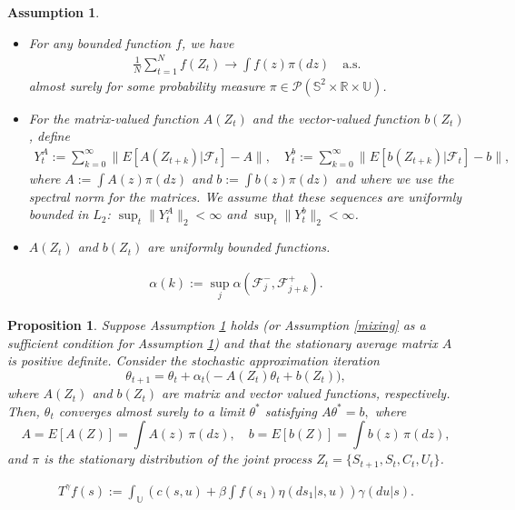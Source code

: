 \documentclass[10pt,a4paper]{amsart}
\newtheorem{assumption}{Assumption}
\newtheorem{prop}{Proposition}
\def\P{{\mathcal P}}
\begin{document}
\begin{assumption}\label{poisson}
\begin{itemize}
\item[i.] For any bounded function $f$, we have
\begin{align*}
\frac{1}{N} \sum_{t=1}^N f(Z_t) \to \int f(z) \pi(dz) \quad \text{a.s.}
\end{align*}
almost surely for some probability measure $\pi \in \P(\mathds{S}^2 \times \mathds{R} \times \mathds{U})$.

\item[ii.] For the matrix-valued function $A(Z_t)$ and the vector-valued function $b(Z_t)$, define
\begin{align}\label{gordin}
Y^A_t := \sum_{k=0}^\infty \| E[A(Z_{t+k})|\mathcal{F}_t] - A \|, \quad
Y^b_t := \sum_{k=0}^\infty \| E[b(Z_{t+k})|\mathcal{F}_t] - b \|,
\end{align}
where $A := \int A(z) \pi(dz)$ and $b := \int b(z) \pi(dz)$ and where we use the spectral norm for the matrices. We assume that these sequences are uniformly bounded in $L_2$: $\sup_t \|Y^A_t\|_2 < \infty$ and $\sup_t \|Y^b_t\|_2 < \infty$.

\item[iii.] $A(Z_t)$ and $b(Z_t)$ are uniformly bounded functions.
\end{itemize}
\end{assumption}

\begin{align}\label{mixing}
\alpha(k):=\sup_j \alpha(\mathcal{F}_j^- , \mathcal{F}^+_{j+k}).
\end{align}

\begin{prop}\label{key_prop}
Suppose Assumption \ref{poisson} holds (or Assumption \ref{mixing} as a sufficient condition for Assumption \ref{poisson}) and that the stationary average matrix $A$ is positive definite. Consider the stochastic approximation iteration
\[
\theta_{t+1} = \theta_t + \alpha_t \big( -A(Z_t) \theta_t + b(Z_t) \big),
\]
where $A(Z_t)$ and $b(Z_t)$ are matrix and vector valued functions, respectively. Then, $\theta_t$ converges almost surely to a limit $\theta^*$ satisfying
$
A \theta^* = b,
$
where
\[
A = E[A(Z)] = \int A(z) \, \pi(dz), \quad 
b = E[b(Z)] = \int b(z) \, \pi(dz),
\]
and $\pi$ is the stationary distribution of the joint process $Z_t = \{S_{t+1}, S_t, C_t, U_t\}$.
\end{prop}

\begin{align}\label{appr_bell}
T^\gamma f(s) := \int_\mathds{U}\left(c(s,u) + \beta \int f(s_1)\eta(ds_1|s,u)\right)\gamma(du|s).
\end{align}
\end{document}
